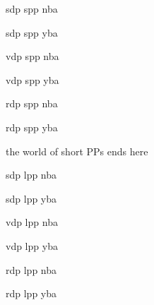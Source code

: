\documentclass[10pt,letterpaper]{article}
\begin{document}
\begin{center}
    
    sdp spp nba
\end{center}

\begin{center}
    
    sdp spp yba
\end{center}

\begin{center}
    
    vdp spp nba
\end{center}

\begin{center}
    
    vdp spp yba
\end{center}

\begin{center}
    
    rdp spp nba
\end{center}

\begin{center}
    
    rdp spp yba
\end{center}

\vfill
\dotfill the world of short PPs ends here \dotfill

\begin{center}
    
    sdp lpp nba
\end{center}

\begin{center}
    
    sdp lpp yba
\end{center}

\begin{center}
    
    vdp lpp nba
\end{center}

\begin{center}
    
    vdp lpp yba
\end{center}

\begin{center}
    
    rdp lpp nba
\end{center}

\begin{center}
    
    rdp lpp yba
\end{center}
%     
\end{document}
